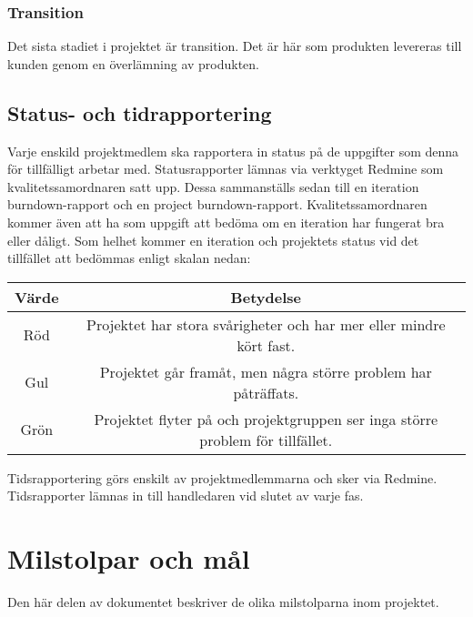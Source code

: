 \subsubsection*{Transition}
Det sista stadiet i projektet är transition. Det är här som produkten levereras till kunden genom en överlämning av produkten.

\subsection{Status- och tidrapportering}
Varje enskild projektmedlem ska rapportera in status på de uppgifter som denna för tillfälligt arbetar med. Statusrapporter lämnas via verktyget Redmine som kvalitetssamordnaren satt upp. Dessa sammanställs sedan till en iteration burndown-rapport och en project burndown-rapport. Kvalitetssamordnaren kommer även att ha som uppgift att bedöma om en iteration har fungerat bra eller dåligt. Som helhet kommer en iteration och projektets status vid det tillfället att bedömmas enligt skalan nedan:

\begin{center}
	\begin{tabular}{| c | c |}
		\hline
		\textbf{Värde} & \textbf{Betydelse} \\
		\hline
		Röd & Projektet har stora svårigheter och har mer eller mindre kört fast. \\
		\hline
		Gul & Projektet går framåt, men några större problem har påträffats. \\
		\hline
		Grön & Projektet flyter på och projektgruppen ser inga större problem för tillfället. \\
		\hline
	\end{tabular}
\end{center}

Tidsrapportering görs enskilt av projektmedlemmarna och sker via Redmine. Tidsrapporter lämnas in till handledaren vid slutet av varje fas.

\newpage

\section{Milstolpar och mål}
Den här delen av dokumentet beskriver de olika milstolparna inom projektet.

